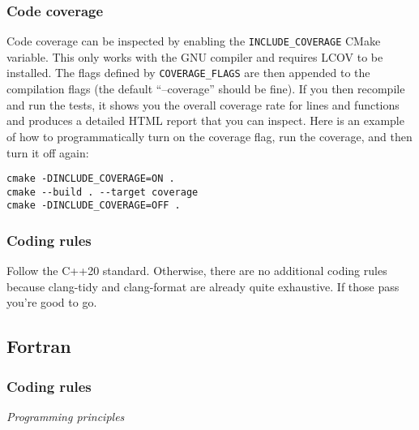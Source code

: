 \documentclass{article}
\begin{document}
\subsubsection{Code coverage}

Code coverage can be inspected by enabling the \verb+INCLUDE_COVERAGE+ CMake variable. This only works with the GNU compiler and requires LCOV to be installed. The flags defined by \verb+COVERAGE_FLAGS+ are then appended to the compilation flags (the default ``--coverage'' should be fine). If you then recompile and run the tests, it shows you the overall coverage rate for lines and functions and produces a detailed HTML report that you can inspect. Here is an example of how to programmatically turn on the coverage flag, run the coverage, and then turn it off again:
\begin{verbatim}
cmake -DINCLUDE_COVERAGE=ON .
cmake --build . --target coverage
cmake -DINCLUDE_COVERAGE=OFF .
\end{verbatim}

\subsubsection{Coding rules}

Follow the C++20 standard. Otherwise, there are no additional coding rules because clang-tidy and clang-format are already quite exhaustive. If those pass you're good to go.

\subsection{Fortran}

\subsubsection{Coding rules}

\textit{Programming principles}
\end{document}

